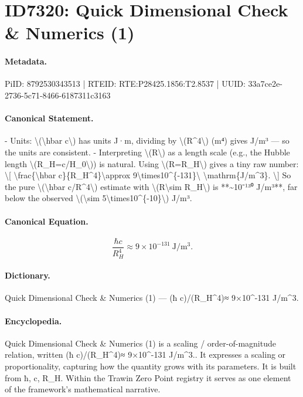 \section*{ID7320: Quick Dimensional Check \& Numerics (1)}
\paragraph{Metadata.}
PiID: 8792530343513 | RTEID: RTE:P28425.1856:T2.8537 | UUID: 33a7ce2e-2736-5c71-8466-6187311c3163

\paragraph{Canonical Statement.}
- Units: \textbackslash{}(\textbackslash{}hbar c\textbackslash{}) has units J·m, dividing by \textbackslash{}(R\textasciicircum{}4\textbackslash{}) (m⁴) gives J/m³ — so the units are consistent. - Interpreting \textbackslash{}(R\textbackslash{}) as a length scale (e.g., the Hubble length \textbackslash{}(R\_H=c/H\_0\textbackslash{})) is natural. Using \textbackslash{}(R=R\_H\textbackslash{}) gives a tiny raw number: \textbackslash{}[ \textbackslash{}frac\{\textbackslash{}hbar c\}\{R\_H\textasciicircum{}4\}\textbackslash{}approx 9\textbackslash{}times10\textasciicircum{}\{-131\}\textbackslash{} \textbackslash{}mathrm\{J/m\textasciicircum{}3\}. \textbackslash{}] So the pure \textbackslash{}(\textbackslash{}hbar c/R\textasciicircum{}4\textbackslash{}) estimate with \textbackslash{}(R\textbackslash{}sim R\_H\textbackslash{}) is **\textasciitilde{}10⁻¹³⁰ J/m³**, far below the observed \textbackslash{}(\textbackslash{}sim 5\textbackslash{}times10\textasciicircum{}\{-10\}\textbackslash{}) J/m³.

\paragraph{Canonical Equation.}
\[
\frac{\hbar c}{R_H^4}\approx 9\times10^{-131}\ \mathrm{J/m^3}.
\]

\paragraph{Dictionary.}
Quick Dimensional Check \& Numerics (1) — (ħ c)/(R\_H\textasciicircum{}4)≈ 9×10\textasciicircum{}-131 J/m\textasciicircum{}3.

\paragraph{Encyclopedia.}
Quick Dimensional Check \& Numerics (1) is a scaling / order-of-magnitude relation, written (ħ c)/(R\_H\textasciicircum{}4)≈ 9×10\textasciicircum{}-131 J/m\textasciicircum{}3.. It expresses a scaling or proportionality, capturing how the quantity grows with its parameters. It is built from ħ, c, R\_H. Within the Trawin Zero Point registry it serves as one element of the framework's mathematical narrative.
